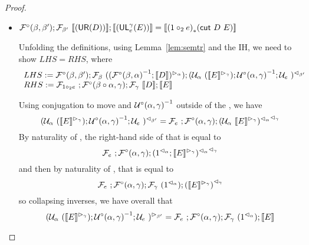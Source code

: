\documentclass{drl-common/llncs}
\renewcommand{\sem}[1]{\ensuremath{ \llbracket #1 \rrbracket}}
\newcommand{\inv}[1]{\ensuremath{{#1}^{-1}}}
\newcommand\compo[2]{\ensuremath{#1 \circ #2}}
\newcommand\comph[2]{\ensuremath{#1 \mathbin{\circ_2} #2}}
\newcommand\tr[2]{\ensuremath{{{#1}_{*}(#2)}}}
\newcommand\cutsym{\ensuremath{\dsd{cut}}}
\newcommand\cut[2]{\ensuremath{{\cutsym \,\, #1 \,\, #2}}}
\newcommand\UL[3]{\ensuremath{\dsd{UL}^{#1}_{#2}(#3)}}
\newcommand\UR[1]{\ensuremath{\dsd{UR}(#1)}}
\begin{document}
\begin{proof}
\begin{itemize}
\item $\semofcut {(\UR D)} {(\UL \gamma e E)} = \sem{\tr {(\comph{1}{e})} {\cut D E}}$

Unfolding the definitions, using Lemma~\ref{lem:semtr} and the IH, we
need to show $LHS = RHS$, where
\[
\begin{array}{l}
LHS := \semFcomp(\beta,\beta');\semF{\beta}{(\semltor{(\inv{\semFcomp(\beta,\alpha)};\sem{D})}{\alpha}  )};
\semrtol{(\semU{\alpha}{(\semltor{\sem{E}}{\gamma})};\inv{\semUcomp(\alpha,\gamma)};\semU{e})}{\beta'}\\
RHS := \semF{\comph{1}{e}};\semFcomp(\compo{\beta}{\alpha},\gamma);\semF{\gamma}{\sem{D}};\sem{E}
\end{array}
\]

Using conjugation to move  and
\inv{\semUcomp(\alpha,\gamma)} outside of the , we have
\[
\semrtol{(\semU{\alpha}{(\semltor{\sem{E}}{\gamma})};\inv{\semUcomp(\alpha,\gamma)};\semU{e})}{\beta'}
= 
\semF{e};\semFcomp(\alpha,\gamma);\semrtol{{\semrtol{(\semU{\alpha}{\semltor{\sem E}{\gamma}})}{\alpha}}}{\gamma}
\]
By naturality of \semrtol{-}{\alpha}, the right-hand side of that is equal to
\[
\semF{e};\semFcomp(\alpha,\gamma);\semrtol{{\semrtol{(\semrtol{1}{\alpha};\semltor{\sem{E}}{\gamma})}{\alpha}}}{\gamma}
\]
and then by naturality of \semrtol{-}{\gamma}, that is equal to
\[
\semF{e};\semFcomp(\alpha,\gamma);\semF{\gamma}{(\semrtol{1}{\alpha})};\semrtol{{{(\semltor{\sem{E}}{\gamma})}}}{\gamma}
\]
so collapsing inverses, we have overall that
\[
\semltor{(\semU{\alpha}{(\semltor{\sem{E}}{\gamma})};\inv{\semUcomp(\alpha,\gamma)};\semU{e})}{\beta'}
=
\semF{e};\semFcomp(\alpha,\gamma);\semF{\gamma}{(\semrtol{1}{\alpha})};\sem{E}
\]


\end{itemize}
\end{proof}
\end{document}
